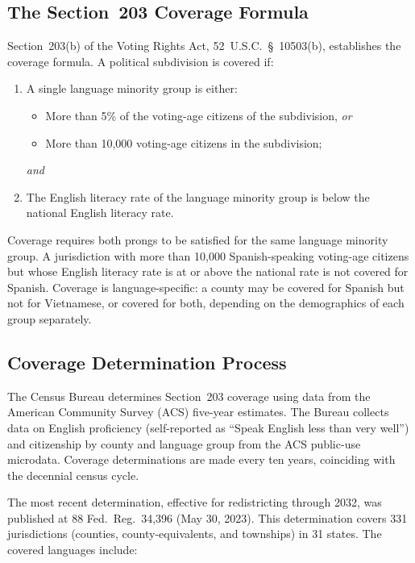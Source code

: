 \label{sec:background}

\subsection{The Section~203 Coverage Formula}

Section~203(b) of the Voting Rights Act, 52~U.S.C.~\S~10503(b), establishes
the coverage formula. A political subdivision is covered if:

\begin{enumerate}
\item A single language minority group is either:
  \begin{itemize}
  \item More than 5\% of the voting-age citizens of the subdivision, \textit{or}
  \item More than 10,000 voting-age citizens in the subdivision;
  \end{itemize}
  \textit{and}
\item The English literacy rate of the language minority group is below
  the national English literacy rate.
\end{enumerate}

Coverage requires both prongs to be satisfied for the same language
minority group. A jurisdiction with more than 10,000 Spanish-speaking
voting-age citizens but whose English literacy rate is at or above
the national rate is not covered for Spanish. Coverage is language-specific:
a county may be covered for Spanish but not for Vietnamese, or covered for
both, depending on the demographics of each group separately.

\subsection{Coverage Determination Process}

The Census Bureau determines Section~203 coverage using data from the
American Community Survey (ACS) five-year estimates. The Bureau collects
data on English proficiency (self-reported as ``Speak English less than
very well'') and citizenship by county and language group from the ACS
public-use microdata. Coverage determinations are made every ten years,
coinciding with the decennial census cycle.

The most recent determination, effective for redistricting through 2032,
was published at 88 Fed.\ Reg.\ 34,396 (May 30, 2023). This determination
covers 331 jurisdictions (counties, county-equivalents, and townships)
in 31 states. The covered languages include:

